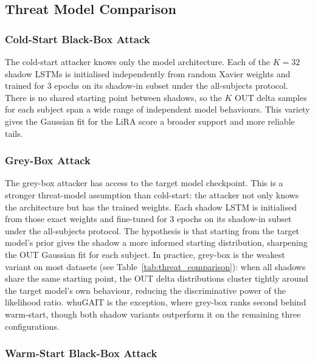 \subsection{Threat Model Comparison}
\label{sec:mia_threat}

\subsubsection{Cold-Start Black-Box Attack}
\label{ssec:mia_cold}

The cold-start attacker knows only the model architecture. Each of the $K = 32$ shadow LSTMs is initialised independently from random Xavier weights and trained for 3 epochs on its shadow-in subset under the all-subjects protocol. There is no shared starting point between shadows, so the $K$ OUT delta samples for each subject span a wide range of independent model behaviours. This variety gives the Gaussian fit for the LiRA score a broader support and more reliable tails.

\subsubsection{Grey-Box Attack}
\label{ssec:mia_grey}

The grey-box attacker has access to the target model checkpoint. This is a stronger threat-model assumption than cold-start: the attacker not only knows the architecture but has the trained weights. Each shadow LSTM is initialised from those exact weights and fine-tuned for 3 epochs on its shadow-in subset under the all-subjects protocol. The hypothesis is that starting from the target model's prior gives the shadow a more informed starting distribution, sharpening the OUT Gaussian fit for each subject. In practice, grey-box is the weakest variant on most datasets (see Table~\ref{tab:threat_comparison}): when all shadows share the same starting point, the OUT delta distributions cluster tightly around the target model's own behaviour, reducing the discriminative power of the likelihood ratio. whuGAIT is the exception, where grey-box ranks second behind warm-start, though both shadow variants outperform it on the remaining three configurations.

\subsubsection{Warm-Start Black-Box Attack}
\label{ssec:mia_warm}

